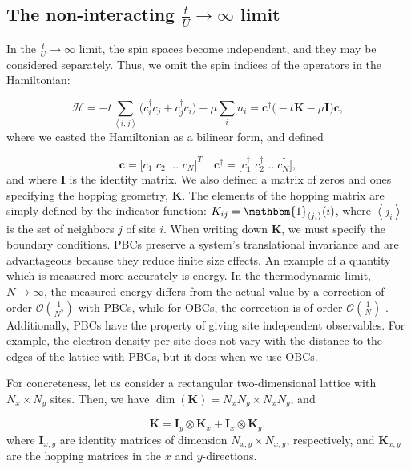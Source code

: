 \subsection{The non-interacting $\frac{t}{U} \rightarrow \infty$ limit}

In the $\frac{t}{U} \rightarrow \infty$ limit, the spin spaces become independent, and they may be considered separately.
Thus, we omit the spin indices of the operators in the Hamiltonian:

\begin{equation}
\mathcal{H} = -t \sum_{\left\langle i, j \right\rangle} \bigg( c_i^\dagger c_j + c_j^\dagger c_i \bigg) - \mu \sum_i n_i = \bm c^\dagger \bigg( -t \bm K - \mu \bm I \bigg) \bm c ,
\end{equation}
where we casted the Hamiltonian as a bilinear form, and defined

\begin{equation}
\bm c = \bigg[ c_1 \,\, c_2 \,\, ... \,\, c_N \bigg]^T \quad \bm c^\dagger = \bigg[c_1^\dagger \,\, c_2^\dagger \,\, ... c_N^\dagger \bigg] ,
\end{equation}
and where $\bm I$ is the identity matrix.
We also defined a matrix of zeros and ones specifying the hopping geometry, $\bm K$. The elements of the hopping matrix are simply defined by the indicator function: $K_{ij} = \mathbbm{1}_{\left\langle j_i \right\rangle} (i)$, where $\left\langle j_i \right\rangle$ is the set of neighbors $j$ of site $i$.
When writing down $\bm K$, we must specify the boundary conditions.
\acp{PBC} preserve a system's translational invariance and are advantageous because they reduce finite size effects.
An example of a quantity which is measured more accurately is energy.
In the thermodynamic limit, $N \rightarrow \infty$, the measured energy differs from the actual value by a correction of order $\mathcal{O}(\frac{1}{N^2})$ with \acp{PBC}, while for \acp{OBC}, the correction is of order $\mathcal{O}(\frac{1}{N})$ \cite{hou_numerical_2009}.
Additionally, \acp{PBC} have the property of giving site independent observables.
For example, the electron density per site does not vary with the distance to the edges of the lattice with \acp{PBC}, but it does when we use \acp{OBC}.

For concreteness, let us consider a rectangular two-dimensional lattice with $N_x \times N_y$ sites. Then, we have $\dim(\bm K) = N_x N_y \times N_x N_y $, and

\begin{equation}
\bm K = \bm I_y \otimes \bm K_x + \bm I_x \otimes \bm K_y ,
\end{equation}
where $\bm I_{x, y}$ are identity matrices of dimension $N_{x, y} \times N_{x, y}$, respectively, and $\bm K_{x, y}$ are the hopping matrices in the $x$ and $y$-directions.

